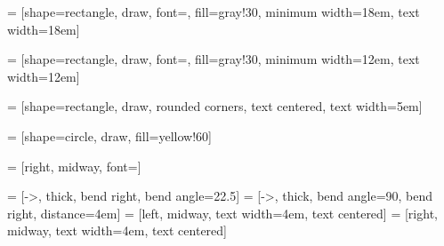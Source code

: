  = [shape=rectangle, draw, font=\footnotesize,
                   fill=gray!30, minimum width=18em, text width=18em]

 = [shape=rectangle, draw, font=\footnotesize,
                    fill=gray!30, minimum width=12em, text width=12em]

 = [shape=rectangle, draw, rounded corners,
                   text centered, text width=5em]

 = [shape=circle, draw, fill=yellow!60]

 = [right, midway, font=\large]

 = [->, thick, bend right, bend angle=22.5]
 = [->, thick, bend angle=90, bend right, distance=4em]
 = [left, midway, text width=4em, text centered]
 = [right, midway, text width=4em, text centered]

